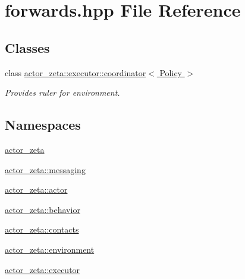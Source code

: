 \hypertarget{libactor__zeta__core_2actor-zeta_2forwards_8hpp}{}\section{forwards.\+hpp File Reference}
\label{libactor__zeta__core_2actor-zeta_2forwards_8hpp}
\subsection*{Classes}
\begin{DoxyCompactItemize}
\item 
class \hyperlink{classactor__zeta_1_1executor_1_1coordinator}{actor\+\_\+zeta\+::executor\+::coordinator$<$ Policy $>$}
\begin{DoxyCompactList}\small\item\em Provides ruler for environment. \end{DoxyCompactList}\end{DoxyCompactItemize}
\subsection*{Namespaces}
\begin{DoxyCompactItemize}
\item 
 \hyperlink{namespaceactor__zeta}{actor\+\_\+zeta}
\item 
 \hyperlink{namespaceactor__zeta_1_1messaging}{actor\+\_\+zeta\+::messaging}
\item 
 \hyperlink{namespaceactor__zeta_1_1actor}{actor\+\_\+zeta\+::actor}
\item 
 \hyperlink{namespaceactor__zeta_1_1behavior}{actor\+\_\+zeta\+::behavior}
\item 
 \hyperlink{namespaceactor__zeta_1_1contacts}{actor\+\_\+zeta\+::contacts}
\item 
 \hyperlink{namespaceactor__zeta_1_1environment}{actor\+\_\+zeta\+::environment}
\item 
 \hyperlink{namespaceactor__zeta_1_1executor}{actor\+\_\+zeta\+::executor}
\end{DoxyCompactItemize}
